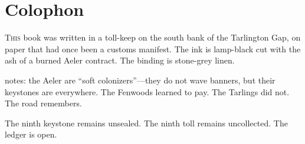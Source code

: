 \documentclass[11pt,a5paper]{book}
\begin{document}
\clearpage

\chapter*{Colophon}

\lettrine{T}{his} book was written in a toll-keep on the south bank of the Tarlington Gap, on paper that had once been a customs manifest. The ink is lamp-black cut with the ash of a burned Aeler contract. The binding is stone-grey linen.

\gray{} notes: the Aeler are ``soft colonizers''---they do not wave banners, but their keystones are everywhere. The Fenwoods learned to pay. The Tarlings did not. The road remembers.

\vspace{1em}
\noindent The ninth keystone remains unsealed. The ninth toll remains uncollected. The ledger is open.
\end{document}
